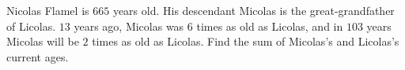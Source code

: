 Nicolas Flamel is $665$ years old. His descendant Micolas is the great-grandfather of Licolas. $13$ years ago, Micolas was $6$ times as old as Licolas, and in $103$ years Micolas will be $2$ times as old as Licolas. Find the sum of Micolas's and Licolas's current ages.
